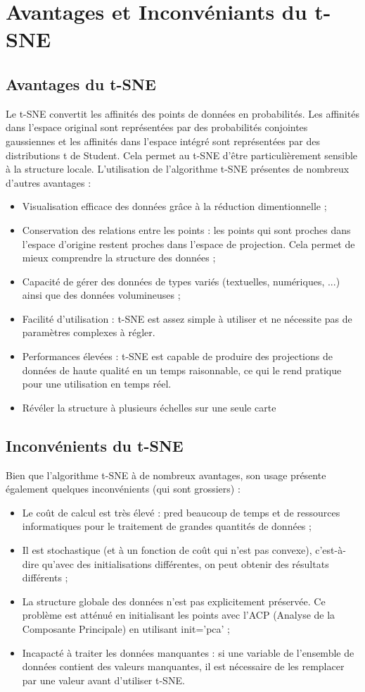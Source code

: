 \documentclass[12pt,a4paper]{article}
\begin{document}
	\newpage
	\section{Avantages et Inconvéniants du t-SNE}
	\subsection{Avantages du t-SNE}
	Le t-SNE convertit les affinités des points de données en probabilités. Les affinités dans l'espace original sont représentées par des probabilités conjointes gaussiennes et les affinités dans l'espace intégré sont représentées par des distributions t de Student. Cela permet au t-SNE d'être particulièrement sensible à la structure locale. L'utilisation de l'algorithme t-SNE présentes de nombreux d'autres avantages :
	\begin{itemize}
		\item Visualisation efficace des données grâce à la réduction dimentionnelle ;
		\item Conservation des relations entre les points : les points qui sont proches dans l'espace d'origine restent proches dans l'espace de projection. Cela permet de mieux comprendre la structure des données ;
		\item Capacité de gérer des données de types variés (textuelles, numériques, ...) ainsi que des données volumineuses ;
		\item Facilité d'utilisation : t-SNE est assez simple à utiliser et ne nécessite pas de paramètres complexes à régler.
		\item Performances élevées : t-SNE est capable de produire des projections de données de haute qualité en un temps raisonnable, ce qui le rend pratique pour une utilisation en temps réel.
		\item Révéler la structure à plusieurs échelles sur une seule carte
	\end{itemize}

	\subsection{Inconvénients du t-SNE}
	Bien que l'algorithme t-SNE à de nombreux avantages, son usage présente également quelques inconvénients (qui sont grossiers) :
	\begin{itemize}
		\item Le coût de calcul est très élevé : pred beaucoup de temps et de ressources informatiques pour le traitement de grandes quantités de données ;
		\item Il est stochastique (et à un fonction de coût qui n'est pas convexe), c'est-à-dire qu'avec des initialisations différentes, on peut obtenir des résultats différents ;
		\item La structure globale des données n'est pas explicitement préservée. Ce problème est atténué en initialisant les points avec l'ACP (Analyse de la Composante Principale) en utilisant init='pca' ;
		\item Incapacté à traiter les données manquantes : si une variable de l'ensemble de données contient des valeurs manquantes, il est nécessaire de les remplacer par une valeur avant d'utiliser t-SNE.
	\end{itemize}
\end{document}
